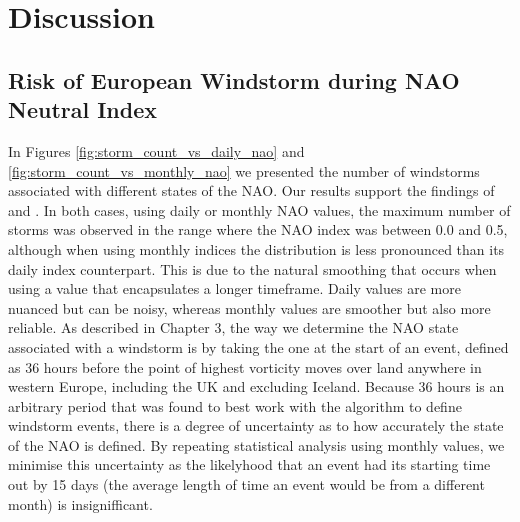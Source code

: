 \section{Discussion}

    \subsection{Risk of European Windstorm during NAO Neutral Index}

        In Figures \ref{fig:storm_count_vs_daily_nao} and \ref{fig:storm_count_vs_monthly_nao} we presented the number of windstorms associated with different states of the NAO. Our results support the findings of \cite{https://doi.org/10.1002/joc.1982} and \cite{https://doi.org/10.1002/2014GL059647}. In both cases, using daily or monthly NAO values, the maximum number of storms was observed in the range where the NAO index was between 0.0 and 0.5, although when using monthly indices the distribution is less pronounced than its daily index counterpart. This is due to the natural smoothing that occurs when using a value that encapsulates a longer timeframe. Daily values are more nuanced but can be noisy, whereas monthly values are smoother but also more reliable. As described in Chapter 3, the way we determine the NAO state associated with a windstorm is by taking the one at the start of an event, defined as 36 hours before the point of highest vorticity moves over land anywhere in western Europe, including the UK and excluding Iceland. Because 36 hours is an arbitrary period that was found to best work with the algorithm to define windstorm events, there is a degree of uncertainty as to how accurately the state of the NAO is defined. By repeating statistical analysis using monthly values, we minimise this uncertainty as the likelyhood that an event had its starting time out by 15 days (the average length of time an event would be from a different month) is insignifficant.

